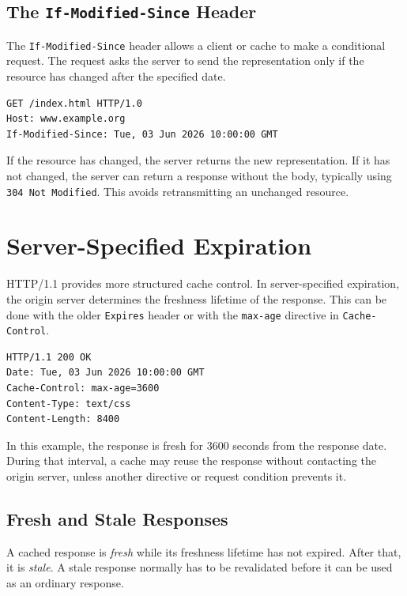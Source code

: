 \documentclass{scrbook}
\begin{document}
\subsection{The \texttt{If-Modified-Since} Header}

The \texttt{If-Modified-Since} header allows a client or cache to make a conditional request. The request asks the server to send the representation only if the resource has changed after the specified date.

\begin{lstlisting}
GET /index.html HTTP/1.0
Host: www.example.org
If-Modified-Since: Tue, 03 Jun 2026 10:00:00 GMT
\end{lstlisting}

If the resource has changed, the server returns the new representation. If it has not changed, the server can return a response without the body, typically using \texttt{304 Not Modified}. This avoids retransmitting an unchanged resource.

\section{Server-Specified Expiration}

HTTP/1.1 provides more structured cache control. In server-specified expiration, the origin server determines the freshness lifetime of the response. This can be done with the older \texttt{Expires} header or with the \texttt{max-age} directive in \texttt{Cache-Control}.

\begin{lstlisting}
HTTP/1.1 200 OK
Date: Tue, 03 Jun 2026 10:00:00 GMT
Cache-Control: max-age=3600
Content-Type: text/css
Content-Length: 8400
\end{lstlisting}

In this example, the response is fresh for 3600 seconds from the response date. During that interval, a cache may reuse the response without contacting the origin server, unless another directive or request condition prevents it.

\subsection{Fresh and Stale Responses}

A cached response is \emph{fresh} while its freshness lifetime has not expired. After that, it is \emph{stale}. A stale response normally has to be revalidated before it can be used as an ordinary response.\\
\end{document}
